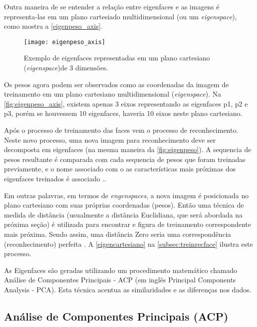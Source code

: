 Outra maneira de se entender a relação entre eigenfaces e as imagens é representa-las em um plano cartesiado multidimensional (ou um \textit{eigenspace}), como mostra a \autoref{eigenpeso_axis}.

\begin{figure}[h]
	\centering
	\texttt{[image: eigenpeso\_axis]}
	\caption{Exemplo de eigenfaces representadas em um plano cartesiano (\textit{eigenspace})de 3 dimensões. }
	\label{fig:eigenpeso_axis}
\end{figure}

Os pesos agora podem ser observados como as coordenadas da imagem de treinamento em um plano cartesiano multidimensional (\textit{eigenspace}). Na \autoref{fig:eigenpeso_axis}, existem apenas 3 eixos representando as eigenfaces p1, p2 e p3, porém se houvessem 10 eigenfaces, haveria 10 eixos neste plano cartesiano.

Após o processo de treinamento das faces vem o processo de reconhecimento. Neste novo processo, uma nova imagem para reconhecimento deve ser decomposta em eigenfaces (na mesma maneira da \autoref{fig:eigenpeso}). A sequencia de pesos resultante é comparada com cada sequencia de pesos que foram treinadas previamente, e o nome associado com o as características mais próximas dos eigenfaces treinados é associado \cite{drmathew_java_programming}..

Em outras palavras, em termos de \textit{engenspaces}, a nova imagem é posicionada no plano cartesiano com suas próprias coordenadas (pesos). Então uma técnica de medida de distância (usualmente a distância Euclidiana, que será abordada na próxima seção) é utilizada para encontrar e figura de treinamento correspondente mais próxima. Sendo assim, uma distância Zero seria uma correspondência (reconhecimento) perfeita \cite{drmathew_java_programming}. A \autoref{eigencartesiano} na \autoref{subsec:treinrecface} ilustra este processo.

As Eigenfaces são geradas utilizando um procedimento matemático chamado Análise de Componentes Principais - ACP (em inglês Principal Components Analysis - PCA). Esta técnica acentua as similaridades e as diferenças nos dados. 



\subsection{Análise de Componentes Principais (ACP)}\label{subsec:acp}

